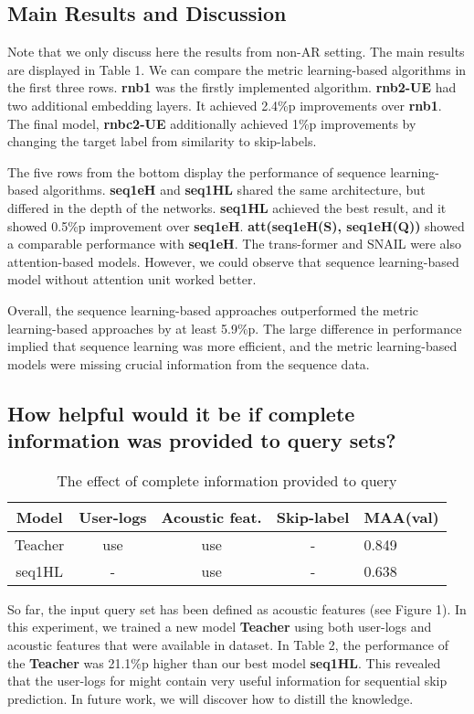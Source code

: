 \subsection{Main Results and Discussion}
Note that we only discuss here the results from non-AR setting. The main results are displayed in Table 1. We can compare the metric learning-based algorithms in the first three rows. \textbf{rnb1} was the firstly implemented algorithm. \textbf{rnb2-UE} had two additional embedding layers. It achieved 2.4\%p improvements over \textbf{rnb1}. The final model, \textbf{rnbc2-UE} additionally achieved 1\%p improvements by changing the target label from similarity to skip-labels.

The five rows from the bottom  display the performance of sequence learning-based algorithms. \textbf{seq1eH} and \textbf{seq1HL} shared the same architecture, but differed in the depth of the networks. \textbf{seq1HL} achieved the best result, and it showed 0.5\%p improvement over \textbf{seq1eH}. \textbf{att(seq1eH(S), seq1eH(Q))} showed a comparable performance with \textbf{seq1eH}. The trans-former\cite{vaswani2017attention} and SNAIL\cite{snail} were also attention-based models. However, we could observe that sequence learning-based model without attention unit worked better. 

Overall, the sequence learning-based approaches outperformed the metric learning-based approaches by at least 5.9\%p. The large difference in performance implied that sequence learning was more efficient, and the metric learning-based models were missing crucial information from the sequence data.

\subsection{How helpful would it be if complete information was provided to query sets?}
\begin{table}
\small
  \caption{The effect of complete information provided to query}
  \label{tab:freq}
  \begin{tabular}{ccccl}
    \toprule
    Model&User-logs & Acoustic feat. & Skip-label & MAA(val) \\
    \midrule
    Teacher&use  & use & - & 0.849\\
    seq1HL&-   & use & - & 0.638\\
    
 
  \bottomrule
\end{tabular}

\end{table}
So far, the input query set  has been defined as acoustic features (see Figure 1). In this experiment, we trained a new model \textbf{Teacher} using both user-logs and acoustic features that were available in dataset. In Table 2, the performance of the \textbf{Teacher} was 21.1\%p higher than our best model \textbf{seq1HL}. This revealed that the user-logs for  might contain very useful information for sequential skip prediction. In future work, we will discover how to distill the knowledge.


